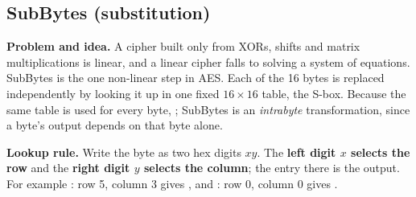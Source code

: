 \subsection{SubBytes (substitution) \hot}

\textbf{Problem and idea.} A cipher built only from XORs, shifts and matrix multiplications is linear, and a linear cipher falls to solving a system of equations. SubBytes is the one non-linear step in AES. Each of the 16 bytes is replaced independently by looking it up in one fixed $16 \times 16$ table, the S-box. Because the same table is used for every byte, ; SubBytes is an \emph{intrabyte} transformation, since a byte's output depends on that byte alone.

\textbf{Lookup rule.} Write the byte as two hex digits $xy$. The \textbf{left digit $x$ selects the row} and the \textbf{right digit $y$ selects the column}; the entry there is the output. For example : row 5, column 3 gives , and : row 0, column 0 gives .


